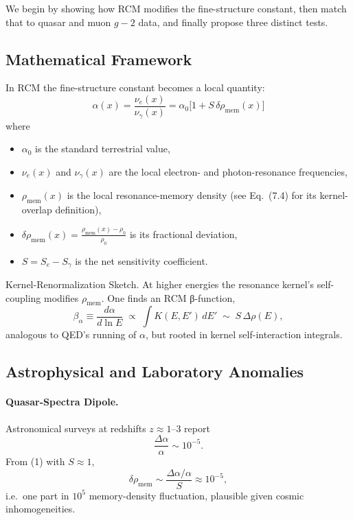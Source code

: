 We begin by showing how RCM modifies the fine-structure constant, then match that to quasar and muon \(g-2\) data, and finally propose three distinct tests.

\bigskip

\subsection{Mathematical Framework}

In RCM the fine-structure constant becomes a local quantity:
\begin{equation}
\boxed{
\alpha(x) = \frac{\nu_e(x)}{\nu_\gamma(x)}
= \alpha_0\bigl[1 + S\,\delta\rho_{\mathrm{mem}}(x)\bigr]
}
\tag{1}
\end{equation}
where
\begin{itemize}
  \item \(\alpha_0\) is the standard terrestrial value,
  \item \(\nu_e(x)\) and \(\nu_\gamma(x)\) are the local electron- and photon-resonance frequencies,
  \item \(\rho_{\mathrm{mem}}(x)\) is the local resonance-memory density (see Eq.~(7.4) for its kernel-overlap definition),
  \item \(\delta\rho_{\mathrm{mem}}(x)=\frac{\rho_{\mathrm{mem}}(x)-\rho_0}{\rho_0}\) is its fractional deviation,
  \item \(S = S_e - S_\gamma\) is the net sensitivity coefficient.
\end{itemize}

Kernel-Renormalization Sketch.  
At higher energies the resonance kernel’s self-coupling modifies \(\rho_{\mathrm{mem}}\). One finds an RCM β-function,
\[
\beta_\alpha \equiv \frac{d\alpha}{d\ln E}
\;\propto\; \int K(E,E')\,dE'
\;\sim\; S\,\Delta\rho(E),
\]
analogous to QED’s running of \(\alpha\), but rooted in kernel self-interaction integrals.

\bigskip

\subsection{Astrophysical and Laboratory Anomalies}

\paragraph{Quasar-Spectra Dipole.}  
Astronomical surveys at redshifts \(z\approx1\)–3 report
\[
\frac{\Delta\alpha}{\alpha}\sim10^{-5}.
\]
From (1) with \(S\approx1\),
\[
\delta\rho_{\mathrm{mem}}\sim\frac{\Delta\alpha/\alpha}{S}\approx10^{-5},
\]
i.e.\ one part in \(10^5\) memory-density fluctuation, plausible given cosmic inhomogeneities.

